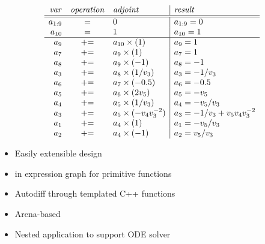\documentclass[10pt]{report}
\begin{document}
{\small
\[
\begin{array}{rcl|l}
{\it var} & {\it operation} & {\it adjoint} & {\it result}
\\ \hline \hline
a_{1:9} & = & 0 & a_{1:9} = 0
\\
a_{10} & = & 1 & a_{10} = 1
\\ \hline
a_{9} & {+}{=} & a_{10} \times (1) & a_9 = 1
\\
a_{7} & {+}{=} & a_9 \times (1) & a_7 = 1
\\
a_{8} & {+}{=} & a_9 \times (-1) & a_8 = -1
\\
a_{3} & {+}{=} & a_8 \times (1 / v_3) & a_3 = -1 / v_3
\\
a_{6} & {+}{=} & a_7 \times (-0.5) & a_6 = -0.5
\\
a_{5} & {+}{=} & a_6 \times (2 v_5) & a_5 = -v_5
\\
a_{4} & {+}{=} & a_5 \times (1 / v_3) & a_4 = -v_5 / v_3
\\
a_{3} & {+}{=} & a_5 \times (-v_4 v_3^{-2}) & a_3 = -1 / v_3 + v_5 v_4 v_3^{-2}
\\
a_{1} & {+}{=} & a_4 \times (1) & a_1 = -v_5 / v_3
\\
a_{2} & {+}{=} & a_4 \times (-1) & a_2 = v_5 / v_3
\end{array}
\]
}


\begin{itemize}
\item Easily extensible  design
%
\item {} in expression graph for primitive functions
%
\item Autodiff through templated C++ functions
%
\end{itemize}

\begin{itemize}
\item Arena-based 
\item Nested application to support ODE solver
\end{itemize}
\end{document}
